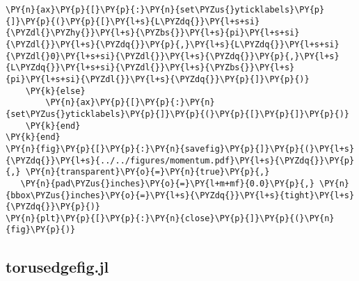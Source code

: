 \begin{Verbatim}[commandchars=\\\{\}]
        \PY{n}{ax}\PY{p}{[}\PY{p}{:}\PY{n}{set\PYZus{}yticklabels}\PY{p}{]}\PY{p}{(}\PY{p}{[}\PY{l+s}{L\PYZdq{}}\PY{l+s+si}{\PYZdl{}\PYZhy{}}\PY{l+s}{\PYZbs{}}\PY{l+s}{pi}\PY{l+s+si}{\PYZdl{}}\PY{l+s}{\PYZdq{}}\PY{p}{,}\PY{l+s}{L\PYZdq{}}\PY{l+s+si}{\PYZdl{}0}\PY{l+s+si}{\PYZdl{}}\PY{l+s}{\PYZdq{}}\PY{p}{,}\PY{l+s}{L\PYZdq{}}\PY{l+s+si}{\PYZdl{}}\PY{l+s}{\PYZbs{}}\PY{l+s}{pi}\PY{l+s+si}{\PYZdl{}}\PY{l+s}{\PYZdq{}}\PY{p}{]}\PY{p}{)}
    \PY{k}{else}
        \PY{n}{ax}\PY{p}{[}\PY{p}{:}\PY{n}{set\PYZus{}yticklabels}\PY{p}{]}\PY{p}{(}\PY{p}{[}\PY{p}{]}\PY{p}{)}
    \PY{k}{end}
\PY{k}{end}
\PY{n}{fig}\PY{p}{[}\PY{p}{:}\PY{n}{savefig}\PY{p}{]}\PY{p}{(}\PY{l+s}{\PYZdq{}}\PY{l+s}{../../figures/momentum.pdf}\PY{l+s}{\PYZdq{}}\PY{p}{,} \PY{n}{transparent}\PY{o}{=}\PY{n}{true}\PY{p}{,}
   \PY{n}{pad\PYZus{}inches}\PY{o}{=}\PY{l+m+mf}{0.0}\PY{p}{,} \PY{n}{bbox\PYZus{}inches}\PY{o}{=}\PY{l+s}{\PYZdq{}}\PY{l+s}{tight}\PY{l+s}{\PYZdq{}}\PY{p}{)}
\PY{n}{plt}\PY{p}{[}\PY{p}{:}\PY{n}{close}\PY{p}{]}\PY{p}{(}\PY{n}{fig}\PY{p}{)}
\end{Verbatim}


\subsection{torus\textunderscore edge\textunderscore fig.jl}\label{subsec:torus-edge}

